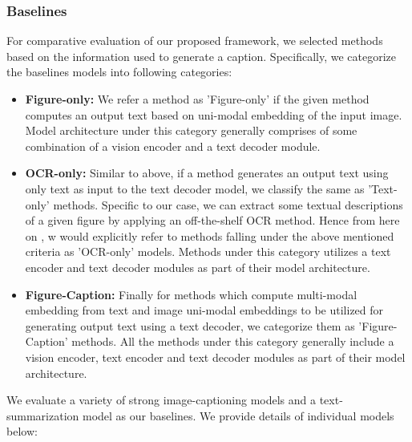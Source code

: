 \documentclass[11pt]{article}
\begin{document}
\subsubsection{Baselines}

For comparative evaluation of our proposed framework, we selected methods based on the information used to generate a caption. Specifically, we categorize the baselines models into following categories: 
\begin{itemize}
    \item \textbf{Figure-only:} We refer a method as 'Figure-only' if the given method computes an output text based on uni-modal embedding of the input image. Model architecture under this category generally comprises of some combination of a vision encoder and a text decoder module.  
    \item \textbf{OCR-only:} Similar to above, if a method generates an output text using only text as input to the text decoder model, we classify the same as 'Text-only' methods. Specific to our case, we can extract some textual descriptions of a given figure by applying an off-the-shelf OCR method. Hence from here on , w would explicitly refer to methods falling under the above mentioned criteria as 'OCR-only' models. Methods under this category utilizes a text encoder and text decoder modules as part of their model architecture. 
    \item \textbf{Figure-Caption:} Finally for methods which compute multi-modal embedding from text and image uni-modal embeddings to be utilized for generating output text using a text decoder, we categorize  them as 'Figure-Caption' methods. All the methods under this category generally include a vision encoder, text encoder and text decoder modules as part of their model architecture.
\end{itemize} 

We evaluate a variety of strong image-captioning models and a text-summarization model as our baselines. We provide details of individual models below:
\end{document}

